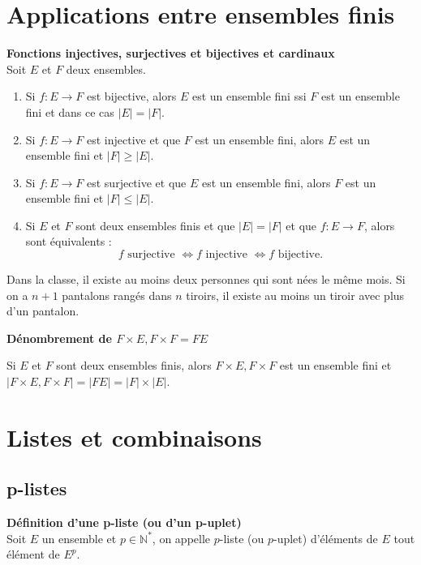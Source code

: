 \documentclass[../PolyS4.tex]{subfiles}
\begin{document}
\section{Applications entre ensembles finis}


\begin{Prop}\textbf{ Fonctions injectives, surjectives et bijectives et cardinaux}\\

Soit $E$ et $F$ deux ensembles.\\
\begin{enumerate}
    \item Si $f : E \to F$ est bijective, alors $E$ est un ensemble fini ssi $F$ est un ensemble fini et dans ce cas $|E| = |F|$.
    \item Si $f : E \to F$ est injective et que $F$ est un ensemble fini, alors $E$ est un ensemble fini et $|F| \geq |E|$.
    \item Si $f : E \to F$ est surjective et que $E$ est un ensemble fini, alors $F$ est un ensemble fini et $|F| \leq |E|$.
    \item Si $E$ et $F$ sont deux ensembles finis et que $|E| = |F|$ et que $f : E \to F$, alors sont équivalents :
    \[
    f \text{ surjective } \iff f \text{ injective } \iff f \text{ bijective.}
    \]
\end{enumerate}
\end{Prop}

\begin{Ex} Dans la classe, il existe au moins deux personnes qui sont nées le même mois. 
Si on a $n + 1$ pantalons rangés dans $n$ tiroirs, il existe au moins un tiroir avec plus d'un pantalon.\\
\end{Ex}

\begin{Prop}\textbf{Dénombrement de \( F \times E, F \times F = F E \)}

Si \( E \) et \( F \) sont deux ensembles finis, alors \( F \times E, F \times F \) est un ensemble fini et \( |F \times E, F \times F| = |F E| = |F| \times |E| \).

\end{Prop}

\section{Listes et combinaisons}

\subsection{p-listes}
\begin{Def}\textbf{Définition d'une p-liste (ou d'un p-uplet)}\\
Soit \( E \) un ensemble et \( p \in \mathbb{N}^* \), on appelle \( p \)-liste (ou \( p \)-uplet) d'éléments de \( E \) tout élément de \( E^p \).\\
 \end{Def}
 
\end{document}
